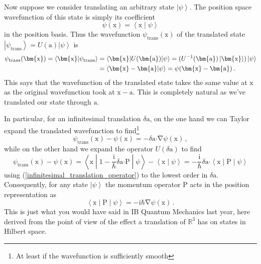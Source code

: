 \documentclass{article}
\theoremstyle{plain}\theoremheaderfont{\normalfont\itshape}\theorembodyfont{\rmfamily}\theoremseparator{.}\newtheorem*{rem}{Remark}\newtheorem*{ex}{Example}\newtheorem*{proof}{Proof}\newtheorem*{altp}{Alternative proof}
\theoremstyle{plain}\theoremheaderfont{\normalfont\bfseries}\theorembodyfont{\rmfamily}\theoremseparator{.}\newtheorem{thm}{Theorem}[section]\newtheorem{lem}[thm]{Lemma}\newtheorem{prop}[thm]{Proposition}\newtheorem*{cor}{Corollary}\newtheorem{defn}[thm]{Definition}\newtheorem{clm}[thm]{Claim}\newtheorem{clminproof}{Claim}
\theoremstyle{break}\theoremheaderfont{\normalfont\itshape}\theorembodyfont{\rmfamily}\theoremseparator{.\medskip}\newtheorem*{proofskip}{Proof}\newtheorem*{exs}{Examples}\newtheorem*{rems}{Remarks}
\theoremstyle{break}\theoremheaderfont{\normalfont\bfseries}\theorembodyfont{\rmfamily}\theoremseparator{.\medskip}\newtheorem{lemskip}[thm]{Lemma}\newtheorem{defnskip}[thm]{Definition}\newtheorem{propskip}[thm]{Proposition}\newtheorem{thmskip}[thm]{Theorem}
\numberwithin{equation}{section}
\newcommand{\ii}{\mathrm{i}}
\newcommand{\ket}[1]{\left| #1 \right\rangle}
\newcommand{\braket}[2]{\left\langle #1 \middle| #2 \right\rangle}
\newcommand{\mel}[3]{\left\langle #1 \middle| #2 \middle| #3 \right\rangle}
\newcommand{\vb}[1]{\bm{\mathrm{#1}}}
\newcommand{\vdot}{\bm{\cdot}}
\newcommand{\grad}{\vb{\nabla}}
\newcommand{\RR}{\mathbb{R}}
\begin{document}
    Now suppose we consider translating an arbitrary state \(\ket{\psi}\). The position space wavefunction of this state is simply its coefficient
    \begin{equation}
        \psi(\vb{x})=\braket{\vb{x}}{\psi}
    \end{equation}
    in the position basis. Thus the wavefunction \(\psi_{\text{trans}}(\vb{x})\) of the translated state \(\ket{\psi_{\text{trans}}}=U(\vb{a})\ket{\psi}\) is
    \begin{align}
        \psi_{\text{trans}}(\vb{x})=\braket{\vb{x}}{\psi_\text{trans}}&=\mel{\vb{x}}{U(\vb{a})}{\psi}=(U^{-1}(\vb{a})\ket{\vb{x}})\ket{\psi}\notag\\
        &=\braket{\vb{x}-\vb{a}}{\psi}=\psi(\vb{x}-\vb{a})\,.
    \end{align}
    This says that the wavefunction of the translated state takes the same value at \(\vb{x}\) as the original wavefunction took at \(\vb{x}-\vb{a}\). This is completely natural as we've translated our state through \(\vb{a}\).

    In particular, for an infinitesimal translation \(\delta\vb{a}\), on the one hand we can Taylor expand the translated wavefunction to find\footnote{At least if the wavefunction is sufficiently smooth}
    \begin{equation}
        \psi_\text{trans}(\vb{x})-\psi(\vb{x})=-\delta\vb{a}\vdot\grad{\psi(\vb{x})}\,,
    \end{equation}
    while on the other hand we expand the operator \(U(\delta\vb{a})\) to find
    \begin{equation}
        \psi_\text{trans}(\vb{x})-\psi(\vb{x})=\mel{\vb{x}}{1-\frac{\ii}{\hbar}\delta\vb{a}\vdot\vb{P}}{\psi}-\braket{\vb{x}}{\psi}=-\frac{\ii}{\hbar}\delta\vb{a}\vdot\mel{\vb{x}}{\vb{P}}{\psi}
    \end{equation}
    using (\ref{infinitesimal_translation_operator}) to the lowest order in \(\delta\vb{a}\). Consequently, for any state \(\ket{\psi}\) the momentum operator \(\vb{P}\) acts in the position representation as
    \begin{equation}\label{momentum_operator_position_representation}
        \mel{\vb{x}}{\vb{P}}{\psi}=-\ii\hbar\grad{\psi(\vb{x})}\,.
    \end{equation}
    This is just what you would have said in IB Quantum Mechanics last year, here derived from the point of view of the effect a translation of \(\RR^3\) has on states in Hilbert space.
\end{document}
